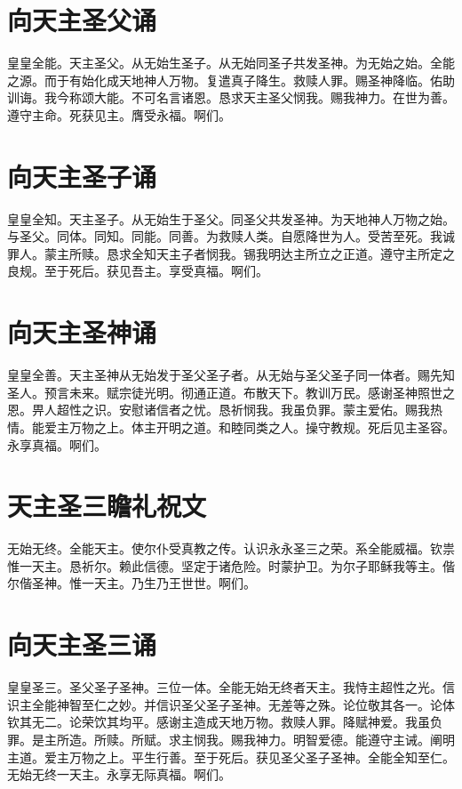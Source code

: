 \documentclass[UTF8,17pt]{ctexart}
\begin{document}
\section{向天主圣⽗诵}

皇皇全能。天主圣⽗。从⽆始⽣圣⼦。从⽆始同圣⼦共发圣神。为⽆始之始。全能之源。⽽于有始化成天地神⼈万物。复遣真⼦降⽣。救赎⼈罪。赐圣神降临。佑助训诲。我今称颂⼤能。不可名⾔诸恩。恳求天主圣⽗悯我。赐我神⼒。在世为善。遵守主命。死获见主。膺受永福。啊们。

\section{向天主圣⼦诵}

皇皇全知。天主圣⼦。从⽆始⽣于圣⽗。同圣⽗共发圣神。为天地神⼈万物之始。与圣⽗。同体。同知。同能。同善。为救赎⼈类。⾃愿降世为⼈。受苦⾄死。我诚罪⼈。蒙主所赎。恳求全知天主⼦者悯我。锡我明达主所⽴之正道。遵守主所定之良规。⾄于死后。获见吾主。享受真福。啊们。

\section{向天主圣神诵}

皇皇全善。天主圣神从⽆始发于圣⽗圣⼦者。从⽆始与圣⽗圣⼦同⼀体者。赐先知圣⼈。预⾔未来。赋宗徒光明。彻通正道。布散天下。教训万民。感谢圣神照世之恩。畀⼈超性之识。安慰诸信者之忧。恳祈悯我。我虽负罪。蒙主爱佑。赐我热情。能爱主万物之上。体主开明之道。和睦同类之⼈。操守教规。死后见主圣容。永享真福。啊们。

\section{天主圣三瞻礼祝⽂}

⽆始⽆终。全能天主。使尔仆受真教之传。认识永永圣三之荣。系全能威福。钦祟惟⼀天主。恳祈尔。赖此信德。坚定于诸危险。时蒙护卫。为尔⼦耶稣我等主。偕尔偕圣神。惟⼀天主。乃⽣乃王世世。啊们。

\section{向天主圣三诵}

皇皇圣三。圣⽗圣⼦圣神。三位⼀体。全能⽆始⽆终者天主。我恃主超性之光。信识主全能神智⾄仁之妙。并信识圣⽗圣⼦圣神。⽆差等之殊。论位敬其各⼀。论体钦其⽆⼆。论荣饮其均平。感谢主造成天地万物。救赎⼈罪。降赋神爱。我虽负罪。是主所造。所赎。所赋。求主悯我。赐我神⼒。明智爱德。能遵守主诫。阐明主道。爱主万物之上。平⽣⾏善。⾄于死后。获见圣⽗圣⼦圣神。全能全知⾄仁。⽆始⽆终⼀天主。永享⽆际真福。啊们。
\end{document}
